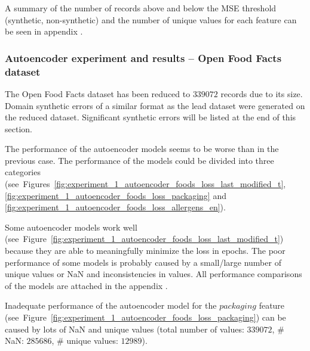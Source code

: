 					A summary of the number of records above and below the MSE threshold (synthetic, non-synthetic) and the number of unique values for each feature can be seen in appendix .
					
				\subsubsection{Autoencoder experiment and results -- Open Food Facts dataset}	
				
					The Open Food Facts dataset has been reduced to $339072$ records due to its size. Domain synthetic errors of a similar format as the lead dataset were generated on the reduced dataset. Significant synthetic errors will be listed at the end of this section.	
						
					The performance of the autoencoder models seems to be worse than in the previous case. The performance of the models could be divided into three categories (see~Figures~\ref{fig:experiment_1_autoencoder_foods_loss_last_modified_t}, \ref{fig:experiment_1_autoencoder_foods_loss_packaging} and \ref{fig:experiment_1_autoencoder_foods_loss_allergens_en}). 
					
					Some autoencoder models work well (see~Figure~\ref{fig:experiment_1_autoencoder_foods_loss_last_modified_t}) because they are able to meaningfully minimize the loss in epochs. The poor performance of some models is probably caused by a small/large number of unique values or NaN and inconsistencies in values. All performance comparisons of the models are attached in the appendix .
											
					
					Inadequate performance of the autoencoder model for the $packaging$ feature (see~Figure~\ref{fig:experiment_1_autoencoder_foods_loss_packaging}) can be caused by lots of NaN and unique values (total number of values: $339072$, \# NaN: $285686$, \# unique values: $12989$).
								
					
